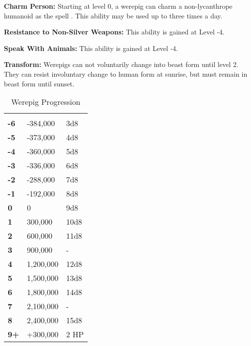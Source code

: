 \begin{multicols*}{2}
\textbf{Charm Person:} Starting at level 0, a werepig can charm a non-lycanthrope humanoid as the spell . This ability may be used up to three times a day.

\textbf{Resistance to Non-Silver Weapons:} This ability is gained at Level -4.

\textbf{Speak With Animals:} This ability is gained at Level -4.

\textbf{Transform:} Werepigs can not voluntarily change into beast form until level 2. They can resist involuntary change to human form at sunrise, but must remain in beast form until sunset.


\begin {table}[H]
  \caption{Werepig Progression}
  \begin{tabularx}{\columnwidth}{>{\bfseries}YYY}
   &  & \\
	-6 & -384,000 & 3d8\\
	-5 & -373,000 & 4d8\\
	-4 & -360,000 & 5d8\\
	-3 & -336,000 & 6d8\\
	-2 & -288,000 & 7d8\\
	-1 & -192,000 & 8d8\\
	0 & 0 & 9d8\\
	1 & 300,000 & 10d8\\
	2 & 600,000 & 11d8\\
	3 & 900,000 & -\\
	4 & 1,200,000 & 12d8\\
	5 & 1,500,000 & 13d8\\
	6 & 1,800,000 & 14d8\\
	7 & 2,100,000 & -\\
	8 & 2,400,000 & 15d8\\
	9+ & +300,000 & 2 HP
  \end {tabularx}
\end {table}


\end{multicols*}
